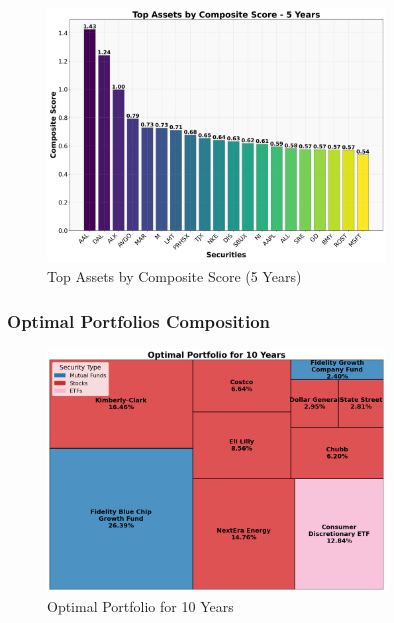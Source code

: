 \begin{figure}[!htbp]
    \centering
    \includegraphics[width=0.8\textwidth]{../Figures/top_assets_composite_score_5_years.png}
    \caption{Top Assets by Composite Score (5 Years)}
    \label{fig:top_assets_5y}
\end{figure}


\newpage

\subsubsection{Optimal Portfolios Composition}


\begin{figure}[!htbp]
    \centering
    \includegraphics[width=0.8\textwidth]{../Figures/optimal_portfolio_10_years.png}
    \caption{Optimal Portfolio for 10 Years}
    \label{fig:optimal_portfolio_10y}
\end{figure}


